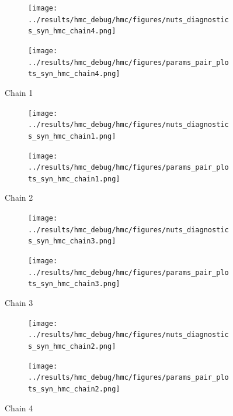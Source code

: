 \documentclass[12pt]{article}
\begin{document}
 \begin{figure}[h!]
   \centering
   \begin{subfigure}{1.0\linewidth}
     \texttt{[image: ../results/hmc\_debug/hmc/figures/nuts\_diagnostics\_syn\_hmc\_chain4.png]}
   \end{subfigure}
   \begin{subfigure}{1.0\linewidth}
     \texttt{[image: ../results/hmc\_debug/hmc/figures/params\_pair\_plots\_syn\_hmc\_chain4.png]}
   \end{subfigure}
   \caption{Chain 1}
   \label{fig:nuts_diags_chain1}
 \end{figure}
 \begin{figure}[h!]
   \centering
   \begin{subfigure}{1.0\linewidth}
     \texttt{[image: ../results/hmc\_debug/hmc/figures/nuts\_diagnostics\_syn\_hmc\_chain1.png]}
   \end{subfigure}
   \begin{subfigure}{1.0\linewidth}
     \texttt{[image: ../results/hmc\_debug/hmc/figures/params\_pair\_plots\_syn\_hmc\_chain1.png]}
   \end{subfigure}
   \caption{Chain 2}
   \label{fig:nuts_diags_chain2}
 \end{figure}
 \begin{figure}[h!]
   \centering
   \begin{subfigure}{1.0\linewidth}
     \texttt{[image: ../results/hmc\_debug/hmc/figures/nuts\_diagnostics\_syn\_hmc\_chain3.png]}
   \end{subfigure}
   \begin{subfigure}{1.0\linewidth}
     \texttt{[image: ../results/hmc\_debug/hmc/figures/params\_pair\_plots\_syn\_hmc\_chain3.png]}
   \end{subfigure}
   \caption{Chain 3}
   \label{fig:nuts_diags_chain3}
 \end{figure}
 \begin{figure}[h!]
   \centering
   \begin{subfigure}{1.0\linewidth}
     \texttt{[image: ../results/hmc\_debug/hmc/figures/nuts\_diagnostics\_syn\_hmc\_chain2.png]}
   \end{subfigure}
   \begin{subfigure}{1.0\linewidth}
     \texttt{[image: ../results/hmc\_debug/hmc/figures/params\_pair\_plots\_syn\_hmc\_chain2.png]}
   \end{subfigure}
   \caption{Chain 4}
   \label{fig:nuts_diags_chain4}
 \end{figure}
\end{document}
